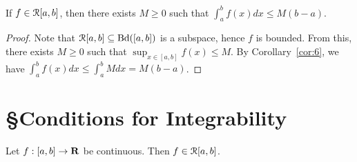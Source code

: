 \documentclass[11pt,twoside,openany]{memoir}
\begin{document}
    \begin{corollary}
        If $f \in \mathcal{R}[a,b]$, then there exists $M \geq 0$ such that $\int_a^b f(x)dx \leq M(b-a)$.
    \end{corollary}
        \begin{proof}
            Note that $\mathcal{R}[a,b] \subseteq \operatorname{Bd}([a,b])$ is a subspace, hence $f$ is bounded. From this, there exists $M \geq 0$ such that $\sup_{x \in [a,b]}f(x) \leq M$. By Corollary~\ref{cor:6}, we have $\int_a^bf(x)dx \leq \int_a^b M dx = M(b-a)$. 
        \end{proof}

\section*{\S\:\:Conditions for Integrability}
    \begin{theorem}\label{thm:cont-implies-inte}
        Let $f:[a,b]\rightarrow \mathbf{R}$ be continuous. Then $f \in \mathcal{R}[a,b]$.
    \end{theorem}
\end{document}
